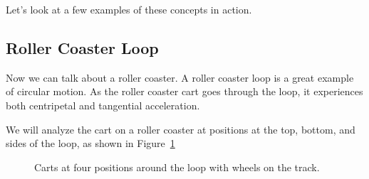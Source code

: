 Let's look at a few examples of these concepts in action.
\subsection{Roller Coaster Loop}
Now we can talk about a roller coaster. A roller coaster loop is a great example of circular motion. As the roller coaster cart goes through the loop, it experiences both centripetal and tangential acceleration.

We will analyze the cart on a roller coaster at positions at the top, bottom, and sides of the loop, as shown in Figure~\ref{fig:roller_allfour}

\begin{figure}[H]
  \centering
  \caption{Carts at four positions around the loop with wheels on the track.}
  \label{fig:roller_allfour}

\end{figure}

